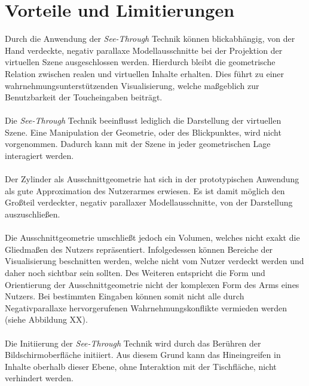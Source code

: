 \section{Vorteile und Limitierungen}
\label{sec:vorteile_und_limitierungen_freischneiden}

Durch die Anwendung der \emph{See-Through} Technik können blickabhängig, von der Hand verdeckte, negativ parallaxe Modellausschnitte bei der Projektion der virtuellen Szene ausgeschlossen werden. Hierdurch bleibt die geometrische Relation zwischen realen und virtuellen Inhalte erhalten. Dies führt zu einer wahrnehmungsunterstützenden Visualisierung, welche maßgeblich zur Benutzbarkeit der Toucheingaben beiträgt.
\\\\
Die \emph{See-Through} Technik beeinflusst lediglich die Darstellung der virtuellen Szene. Eine Manipulation der Geometrie, oder des Blickpunktes, wird nicht vorgenommen. Dadurch kann mit der Szene in jeder geometrischen Lage interagiert werden.
\\\\
Der Zylinder als Ausschnittgeometrie hat sich in der prototypischen Anwendung als gute Approximation des Nutzerarmes erwiesen. Es ist damit möglich den Großteil verdeckter, negativ parallaxer Modellausschnitte, von der Darstellung auszuschließen.
\\\\
Die Ausschnittgeometrie umschließt jedoch ein Volumen, welches nicht exakt die Gliedmaßen des Nutzers repräsentiert. Infolgedessen können Bereiche der Visualisierung beschnitten werden, welche nicht vom Nutzer verdeckt werden und daher noch sichtbar sein sollten. Des Weiteren entspricht die Form und Orientierung der Ausschnittgeometrie nicht der komplexen Form des Arms eines Nutzers. Bei bestimmten Eingaben können somit nicht alle durch Negativparallaxe hervorgerufenen Wahrnehmungskonflikte vermieden werden (siehe Abbildung XX).
\\\\
Die Initiierung der \emph{See-Through} Technik wird durch das Berühren der Bildschirmoberfläche initiiert. Aus diesem Grund kann das Hineingreifen in Inhalte oberhalb dieser Ebene, ohne Interaktion mit der Tischfläche, nicht verhindert werden.